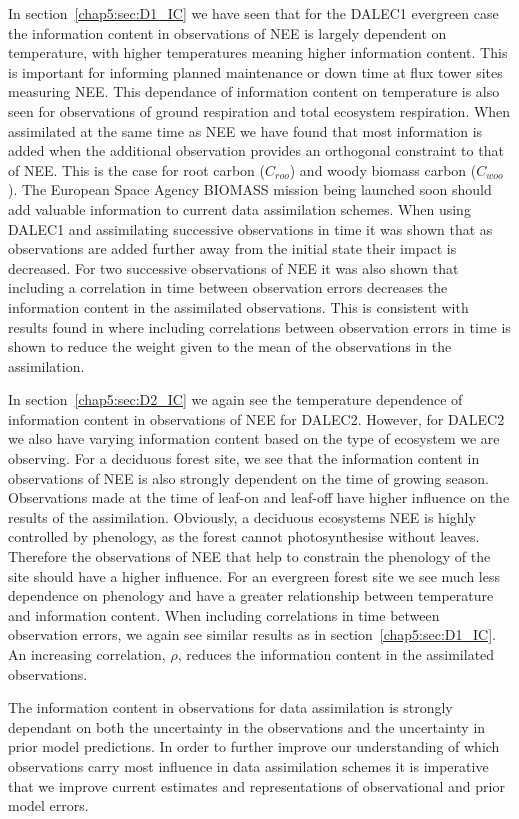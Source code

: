 In section~\ref{chap5:sec:D1_IC} we have seen that for the DALEC1 evergreen case the information content in observations of NEE is largely dependent on temperature, with higher temperatures meaning higher information content. This is important for informing planned maintenance or down time at flux tower sites measuring NEE. This dependance of information content on temperature is also seen for observations of ground respiration and total ecosystem respiration. When assimilated at the same time as NEE we have found that most information is added when the additional observation provides an orthogonal constraint to that of NEE. This is the case for root carbon (\(C_{roo}\)) and woody biomass carbon (\(C_{woo}\)). The European Space Agency BIOMASS mission being launched soon should add valuable information to current data assimilation schemes. When using DALEC1 and assimilating successive observations in time it was shown that as observations are added further away from the initial state their impact is decreased. For two successive observations of NEE it was also shown that including a correlation in time between observation errors decreases the information content in the assimilated observations. This is consistent with results found in \citet{jarvinen1999variational} where including correlations between observation errors in time is shown to reduce the weight given to the mean of the observations in the assimilation.

In section~\ref{chap5:sec:D2_IC} we again see the temperature dependence of information content in observations of NEE for DALEC2. However, for DALEC2 we also have varying information content based on the type of ecosystem we are observing. For a deciduous forest site, we see that the information content in observations of NEE is also strongly dependent on the time of growing season. Observations made at the time of leaf-on and leaf-off have higher influence on the results of the assimilation. Obviously, a deciduous ecosystems NEE is highly controlled by phenology, as the forest cannot photosynthesise without leaves. Therefore the observations of NEE that help to constrain the phenology of the site should have a higher influence. For an evergreen forest site we see much less dependence on phenology and have a greater relationship between temperature and information content. When including correlations in time between observation errors, we again see similar results as in section~\ref{chap5:sec:D1_IC}. An increasing correlation, \(\rho\), reduces the information content in the assimilated observations. 

The information content in observations for data assimilation is strongly dependant on both the uncertainty in the observations and the uncertainty in prior model predictions. In order to further improve our understanding of which observations carry most influence in data assimilation schemes it is imperative that we improve current estimates and representations of observational and prior model errors.  
